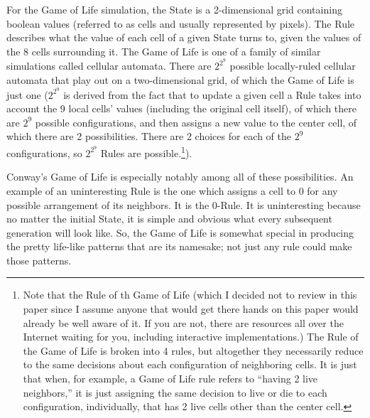 \documentclass{article}
\begin{document}
For the Game of Life simulation, the State is a 2-dimensional grid containing boolean values (referred to as cells and usually represented by pixels). The Rule describes what the value of each cell of a given State turns to, given the values of the 8 cells surrounding it. The Game of Life is one of a family of similar simulations called cellular automata. There are $2^{2^9}$ possible locally-ruled cellular automata that play out on a two-dimensional grid, of which the Game of Life is just one ($2^{2^9}$ is derived from the fact that to update a given cell a Rule takes into account the 9 local cells' values (including the original cell itself), of which there are $2^9$ possible configurations, and then assigns a new value to the center cell, of which there are 2 possibilities. There are 2 choices for each of the $2^9$ configurations, so $2^{2^9}$ Rules are possible.\footnote{Note that the Rule of th Game of Life (which I decided not to review in this paper since I assume anyone that would get there hands on this paper would already be well aware of it. If you are not, there are resources all over the Internet waiting for you, including interactive implementations.) The Rule of the Game of Life is broken into 4 rules, but altogether they necessarily reduce to the same decisions about each configuration of neighboring cells. It is just that when, for example, a Game of Life rule refers to ``having 2 live neighbors,'' it is just assigning the same decision to live or die to each configuration, individually, that has 2 live cells other than the center cell.}).

Conway's Game of Life is especially notably among all of these possibilities. An example of an uninteresting Rule is the one which assigns a cell to 0 for any possible arrangement of its neighbors. It is the 0-Rule. It is uninteresting because no matter the initial State, it is simple and obvious what every subsequent generation will look like. So, the Game of Life is somewhat special in producing the pretty life-like patterns that are its namesake; not just any rule could make those patterns.
\end{document}
